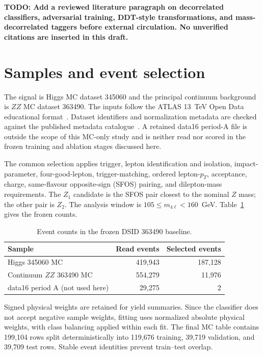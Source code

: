 \documentclass[11pt]{article}
\newcommand{\todo}[1]{\textcolor{red!70!black}{\textbf{TODO: #1}}}
\begin{document}
\todo{Add a reviewed literature paragraph on decorrelated classifiers, adversarial training, DDT-style transformations, and mass-decorrelated taggers before external circulation. No unverified citations are inserted in this draft.}

\section{Samples and event selection}
\label{sec:data}

The signal is Higgs MC dataset 345060 and the principal continuum background is $ZZ$ MC dataset 363490. The inputs follow the ATLAS 13~TeV Open Data educational format~\cite{atlasopendata2025}. Dataset identifiers and normalization metadata are checked against the published metadata catalogue~\cite{atlasmetadata2025}. A retained data16 period-A file is outside the scope of this MC-only study and is neither read nor scored in the frozen training and ablation stages discussed here.

The common selection applies trigger, lepton identification and isolation, impact-parameter, four-good-lepton, trigger-matching, ordered lepton-$p_T$, acceptance, charge, same-flavour opposite-sign (SFOS) pairing, and dilepton-mass requirements. The $Z_1$ candidate is the SFOS pair closest to the nominal $Z$ mass; the other pair is $Z_2$. The analysis window is $105\leq m_{4\ell}<160$~GeV. Table~\ref{tab:samples} gives the frozen counts.

\begin{table}[ht]
\centering
\caption{Event counts in the frozen DSID 363490 baseline.}
\label{tab:samples}
\begin{tabular}{lrr}
\toprule
Sample & Read events & Selected events\\
\midrule
Higgs 345060 MC & 419,943 & 187,128\\
Continuum $ZZ$ 363490 MC & 554,279 & 11,976\\
data16 period A (not used here) & 29,275 & 2\\
\bottomrule
\end{tabular}
\end{table}

Signed physical weights are retained for yield summaries. Since the classifier does not accept negative sample weights, fitting uses normalized absolute physical weights, with class balancing applied within each fit. The final MC table contains 199,104 rows split deterministically into 119,676 training, 39,719 validation, and 39,709 test rows. Stable event identities prevent train--test overlap.
\end{document}
